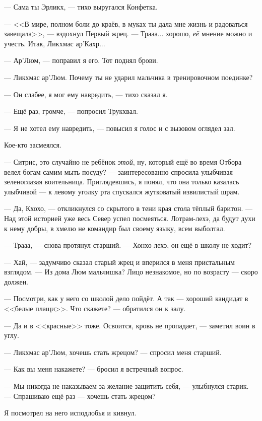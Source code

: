 --- Сама ты Эрликх, --- тихо выругался Конфетка.

--- <<В мире, полном боли до краёв, в муках ты дала мне жизнь и радоваться завещала>>\FM, --- вздохнул Первый жрец.
--- Трааа... хорошо, \emph{её} мнение можно и учесть.
Итак, Ликхмас ар’Кахр...

--- Ар’Люм, --- поправил я его.
Тот поднял брови.

--- Ликхмас ар’Люм.
Почему ты не ударил мальчика в тренировочном поединке?

--- Он слабее, я мог ему навредить, --- тихо сказал я.

--- Ещё раз, громче, --- попросил Трукхвал.

--- Я не хотел ему навредить, --- повысил я голос и с вызовом оглядел зал.

Кое-кто засмеялся.

--- Ситрис, это случайно не ребёнок \emph{этой}, ну, который ещё во время Отбора велел богам самим мыть посуду? --- заинтересованно спросила улыбчивая зеленоглазая воительница.
Приглядевшись, я понял, что она только казалась улыбчивой --- к левому уголку рта спускался жутковатый извилистый шрам.

--- Да, Кхохо, --- откликнулся со скрытого в тени края стола тёплый баритон.
--- Над этой историей уже весь Север успел посмеяться.
Лотрам-лехэ, да будут духи к нему добры, в хмелю не командир был своему языку, всем выболтал.

--- Трааа, --- снова протянул старший.
--- Хонхо-лехэ, он ещё в школу не ходит?

--- Хай, --- задумчиво сказал старый жрец и вперился в меня пристальным взглядом.
--- Из дома Люм мальчишка?
Лицо незнакомое, но по возрасту --- скоро должен.

--- Посмотри, как у него со школой дело пойдёт.
А так --- хороший кандидат в <<белые плащи>>.
Что скажете? --- обратился он к залу.

--- Да и в <<красные>> тоже.
Освоится, кровь не пропадает, --- заметил воин в углу.

--- Ликхмас ар’Люм, хочешь стать жрецом? --- спросил меня старший.

--- Как вы меня накажете? --- бросил я встречный вопрос.

--- Мы никогда не наказываем за желание защитить себя, --- улыбнулся старик.
--- Спрашиваю ещё раз --- хочешь стать жрецом?

Я посмотрел на него исподлобья и кивнул.

